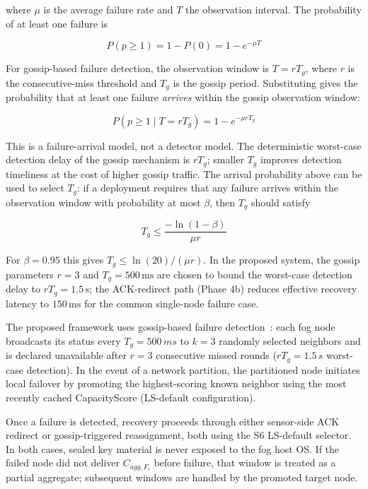 \documentclass[conference]{IEEEtran}
\begin{document}
    where $\mu$ is the average failure rate and $T$ the observation interval. The probability of at least one failure is

    \begin{equation}
    P(p \geq 1) = 1 - P(0) = 1 - e^{-\mu T}
    \end{equation}

    For gossip-based failure detection, the observation window is $T = rT_g$, where $r$ is the consecutive-miss threshold and $T_g$ is the gossip period. Substituting gives the probability that at least one failure \emph{arrives} within the gossip observation window:

    \begin{equation}
    P(p \geq 1 \mid T = rT_g) = 1 - e^{-\mu r T_g}
    \end{equation}

    This is a failure-arrival model, not a detector model. The deterministic worst-case detection delay of the gossip mechanism is $rT_g$; smaller $T_g$ improves detection timeliness at the cost of higher gossip traffic. The arrival probability above can be used to select $T_g$: if a deployment requires that any failure arrives within the observation window with probability at most $\beta$, then $T_g$ should satisfy

    \begin{equation}
    T_g \leq \frac{-\ln(1-\beta)}{\mu r}
    \end{equation}

    For $\beta = 0.95$ this gives $T_g \leq \ln(20)/(\mu r)$. In the proposed system, the gossip parameters $r=3$ and $T_g=500\,\text{ms}$ are chosen to bound the worst-case detection delay to $rT_g = 1.5\,\text{s}$; the ACK-redirect path (Phase 4b) reduces effective recovery latency to $150\,\text{ms}$ for the common single-node failure case.

    The proposed framework uses gossip-based failure detection~\cite{demers1988epidemic}: each fog node broadcasts its status every $T_g=500\,ms$ to $k=3$ randomly selected neighbors and is declared unavailable after $r=3$ consecutive missed rounds ($rT_g=1.5\,s$ worst-case detection). In the event of a network partition, the partitioned node initiates local failover by promoting the highest-scoring known neighbor using the most recently cached CapacityScore (LS-default configuration).

    Once a failure is detected, recovery proceeds through either sensor-side ACK redirect or gossip-triggered reassignment, both using the S6 LS-default selector. In both cases, sealed key material is never exposed to the fog host OS. If the failed node did not deliver $C_{agg,F_i}$ before failure, that window is treated as a partial aggregate; subsequent windows are handled by the promoted target node.
\end{document}

